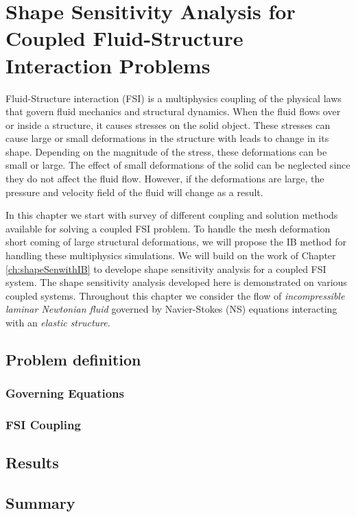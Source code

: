 \chapter{Shape Sensitivity Analysis for Coupled Fluid-Structure Interaction Problems}\label{ch:FSIsen}
Fluid-Structure interaction (FSI) is a multiphysics coupling of the physical laws that govern fluid mechanics and structural dynamics. When the fluid flows over or inside a structure, it causes stresses on the solid object. These stresses can cause large or small deformations in the structure with leads to change in its shape. Depending on the magnitude of the stress, these deformations can be small or large. The effect of small deformations of the solid can be neglected since they do not affect the fluid flow. However, if the deformations are large, the pressure and velocity field of the fluid will change as a result.

In this chapter we start with survey of different coupling and solution methods available for solving a coupled FSI problem. To handle the mesh deformation short coming of large structural deformations, we will propose the IB method for handling these multiphysics simulations. We will build on the work of Chapter \ref{ch:shapeSenwithIB} to develope shape sensitivity analysis for a coupled FSI system. The shape sensitivity analysis developed here is demonstrated on various coupled systems. Throughout this chapter we consider the flow of \emph{incompressible laminar Newtonian fluid} governed by Navier-Stokes (NS) equations interacting with an \emph{elastic structure}. 



\section{Problem definition}
\subsection{Governing Equations}
\subsection{FSI Coupling}
\section{Results}
\section{Summary}